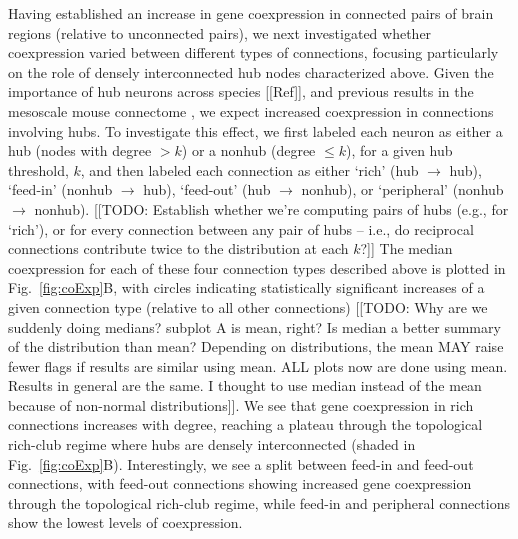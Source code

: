 \documentclass[10pt,letterpaper]{article}
\begin{document}
Having established an increase in gene coexpression in connected pairs of brain regions (relative to unconnected pairs), we next investigated whether coexpression varied between different types of connections, focusing particularly on the role of densely interconnected hub nodes characterized above.
Given the importance of hub neurons across species [[Ref]], and previous results in the mesoscale mouse connectome \cite{Fulcher:2016ck}, we expect increased coexpression in connections involving hubs.
To investigate this effect, we first labeled each neuron as either a hub (nodes with degree $> k$) or a nonhub (degree $\leq k$), for a given hub threshold, $k$, and then labeled each connection as either `rich' (hub $\rightarrow$ hub), `feed-in' (nonhub $\rightarrow$ hub), `feed-out' (hub $\rightarrow$ nonhub), or `peripheral' (nonhub $\rightarrow$ nonhub).
[[TODO: Establish whether we're computing pairs of hubs (e.g., for `rich'), or for every connection between any pair of hubs -- i.e., do reciprocal connections contribute twice to the distribution at each $k$?]]
The median coexpression for each of these four connection types described above is plotted in Fig.~\ref{fig:coExp}B, with circles indicating statistically significant increases of a given connection type (relative to all other connections) [[TODO: Why are we suddenly doing medians? subplot A is mean, right? Is median a better summary of the distribution than mean? Depending on distributions, the mean MAY raise fewer flags if results are similar using mean. ALL plots now are done using mean. Results in general are the same. I thought to use median instead of the mean because of non-normal distributions]].
We see that gene coexpression in rich connections increases with degree, reaching a plateau through the topological rich-club regime where hubs are densely interconnected (shaded in Fig.~\ref{fig:coExp}B).
Interestingly, we see a split between feed-in and feed-out connections, with feed-out connections showing increased gene coexpression through the topological rich-club regime, while feed-in and peripheral connections show the lowest levels of coexpression.
\end{document}
